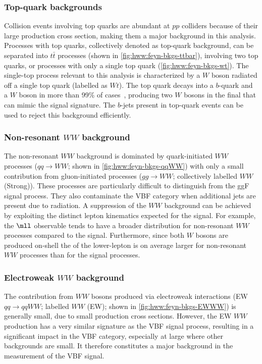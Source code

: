 \subsubsection{Top-quark backgrounds}
Collision events involving top quarks are abundant at $pp$ colliders because of their large production cross section, making them a major background in this analysis.
Processes with top quarks, collectively denoted as top-quark background, can be separated into $t\bar{t}$ processes (shown in \cref{fig:hww:feyn-bkgs-ttbar}), involving two top quarks, or processes with only a single top quark (\cref{fig:hww:feyn-bkgs-wt}). 
The single-top process relevant to this analysis is characterized by a $W$ boson radiated off a single top quark (labelled as $Wt$). 
The top quark decays into a $b$-quark and a $W$ boson in more than 99\% of cases~\cite{PDG2020}, producing two $W$ bosons in the final that can mimic the signal signature. 
The $b$-jets present in top-quark events can be used to reject this background efficiently.

\subsubsection{Non-resonant $WW$ background}
The non-resonant $WW$ background is dominated by quark-initiated $WW$ processes ($qq \to WW$; shown in \cref{fig:hww:feyn-bkgs-qqWW}) with only a small contribution from gluon-initiated processes ($gg \to WW$; collectively labelled $WW$ (Strong)).
These processes are particularly difficult to distinguish from the ggF signal process.
They also contaminate the VBF \TwoJet category when additional jets are present due to radiation. 
A suppression of the $WW$ background can be achieved by exploiting the distinct lepton kinematics expected for the signal. For example, the $\mll$ observable tends to have a broader distribution for non-resonant $WW$ processes compared to the signal. 
Furthermore, since both $W$ bosons are produced on-shell the \pT of the lower-\pT lepton is on average larger for non-resonant $WW$ processes than for the signal processes. 

\subsubsection{Electroweak $WW$ background}
The contribution from $WW$ bosons produced via electroweak interactions (EW $qq \to qqWW$; labelled $WW$ (EW); shown in \cref{fig:hww:feyn-bkgs-EWWW}) is generally small, due to small production cross sections. However, the EW $WW$ production has a very similar signature as the VBF signal process, resulting in a significant impact in the VBF category, especially at large \mjj where other backgrounds are small. 
It therefore constitutes a major background in the measurement of the VBF signal. 

